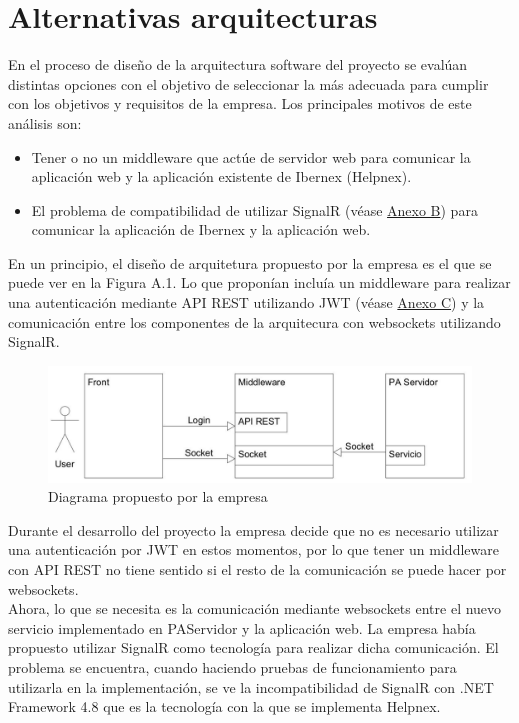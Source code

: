 \chapter{Alternativas arquitecturas}
\label{anexo-a}

En el proceso de diseño de la arquitectura software del proyecto se evalúan distintas opciones con el objetivo de seleccionar la más adecuada para cumplir con los objetivos y requisitos de la empresa. Los principales motivos de este análisis son:

\begin{itemize}
    \item Tener o no un middleware que actúe de servidor web para comunicar la aplicación web y la aplicación existente de Ibernex (Helpnex).
    \item El problema de compatibilidad de utilizar SignalR (véase  \hyperref[anexo-b]{Anexo B}) para comunicar la aplicación de Ibernex y la aplicación web.
\end{itemize}

En un principio, el diseño de arquitetura propuesto por la empresa es el que se puede ver en la Figura A.1. Lo que proponían incluía un middleware para realizar una autenticación mediante API REST utilizando JWT (véase \hyperref[anexo-c]{Anexo C}) y la comunicación entre los componentes de la arquitecura con websockets utilizando SignalR.  

\begin{figure}[!h]
    \centering
    \includegraphics[width=15cm]{Imagenes/Descripcion-arquitectura}
    \caption{Diagrama propuesto por la empresa}
    \label{fig:descripcion-arquitectura}
\end{figure}

Durante el desarrollo del proyecto la empresa decide que no es necesario utilizar una autenticación por JWT en estos momentos, por lo que tener un middleware con API REST no tiene sentido si el resto de la comunicación se puede hacer por websockets.\\

Ahora, lo que se necesita es la comunicación mediante websockets entre el nuevo servicio implementado en PAServidor y la aplicación web. La empresa había propuesto utilizar SignalR como tecnología para realizar dicha comunicación. El problema se encuentra, cuando haciendo pruebas de funcionamiento para utilizarla en la implementación, se ve la incompatibilidad de SignalR con .NET Framework 4.8 que es la tecnología con la que se implementa Helpnex.\\

